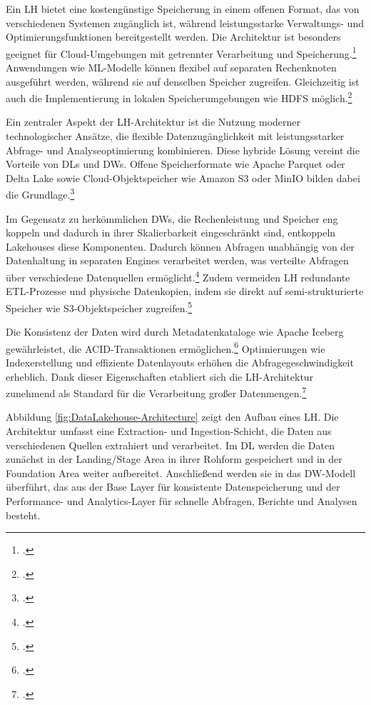 Ein \ac{LH} bietet eine kostengünstige Speicherung in einem offenen Format, das von verschiedenen Systemen zugänglich ist, während leistungsstarke Verwaltungs- und Optimierungsfunktionen bereitgestellt werden. Die Architektur ist besonders geeignet für Cloud-Umgebungen mit getrennter Verarbeitung und Speicherung.\footcite[Vgl.][S. 3]{armbrustLakehouseNewGeneration2021}
Anwendungen wie \ac{ML}-Modelle können flexibel auf separaten Rechenknoten ausgeführt werden, während sie auf denselben Speicher zugreifen. Gleichzeitig ist auch die Implementierung in lokalen Speicherumgebungen wie \ac{HDFS} möglich.\footcite[Vgl.][S. 3]{armbrustLakehouseNewGeneration2021} 

Ein zentraler Aspekt der \ac{LH}-Architektur ist die Nutzung moderner technologischer Ansätze, die flexible Datenzugänglichkeit mit leistungsstarker Abfrage- und Analyseoptimierung kombinieren. Diese hybride Lösung vereint die Vorteile von \ac{DL}s und \ac{DW}s. Offene Speicherformate wie Apache Parquet oder Delta Lake sowie Cloud-Objektspeicher wie Amazon S3 oder MinIO bilden dabei die Grundlage.\footcite[Vgl.][S. 6]{mazumdarDataLakehouseData2023}

Im Gegensatz zu herkömmlichen \ac{DW}s, die Rechenleistung und Speicher eng koppeln und dadurch in ihrer Skalierbarkeit eingeschränkt sind, entkoppeln Lakehouses diese Komponenten. Dadurch können Abfragen unabhängig von der Datenhaltung in separaten Engines verarbeitet werden, was verteilte Abfragen über verschiedene Datenquellen ermöglicht.\footcite[Vgl.][S. 2]{armbrustLakehouseNewGeneration2021}
Zudem vermeiden \ac{LH} redundante \ac{ETL}-Prozesse und physische Datenkopien, indem sie direkt auf semi-strukturierte Speicher wie S3-Objektspeicher zugreifen.\footcite[Vgl.][S. 2]{armbrustLakehouseNewGeneration2021}

Die Konsistenz der Daten wird durch Metadatenkataloge wie Apache Iceberg gewährleistet, die \ac{ACID}-Transaktionen ermöglichen.\footcite[Vgl.][S. 2]{armbrustLakehouseNewGeneration2021} Optimierungen wie Indexerstellung und effiziente Datenlayouts erhöhen die Abfragegeschwindigkeit erheblich. Dank dieser Eigenschaften etabliert sich die \ac{LH}-Architektur zunehmend als Standard für die Verarbeitung großer Datenmengen.\footcite[Vgl.][S. 2]{armbrustLakehouseNewGeneration2021}

Abbildung \ref{fig:DataLakehouse-Architecture} zeigt den Aufbau eines \ac{LH}. Die Architektur umfasst eine Extraction- und Ingestion-Schicht, die Daten aus verschiedenen Quellen extrahiert und verarbeitet. Im \ac{DL} werden die Daten zunächst in der Landing/Stage Area in ihrer Rohform gespeichert und in der Foundation Area weiter aufbereitet. Anschließend werden sie in das \ac{DW}-Modell überführt, das aus der Base Layer für konsistente Datenspeicherung und der Performance- und Analytics-Layer für schnelle Abfragen, Berichte und Analysen besteht.

